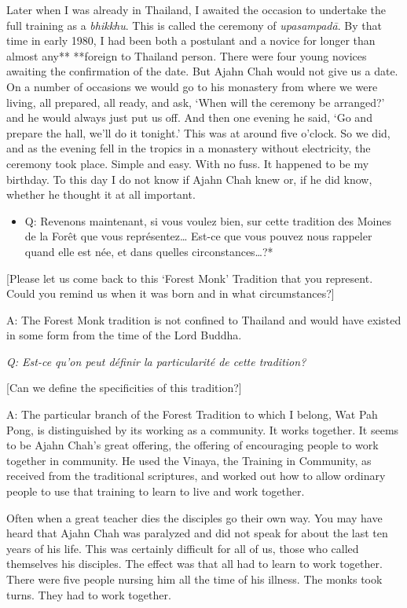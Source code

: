 Later when I was already in Thailand, I awaited the occasion to
undertake the full training as a \emph{bhikkhu}. This is called the
ceremony of \emph{upasampadā}. By that time in early 1980, I had been
both a postulant and a novice for longer than almost any** **foreign to
Thailand person. There were four young novices awaiting the confirmation
of the date. But Ajahn Chah would not give us a date. On a number of
occasions we would go to his monastery from where we were living, all
prepared, all ready, and ask, `When will the ceremony be arranged?' and
he would always just put us off. And then one evening he said, `Go and
prepare the hall, we'll do it tonight.' This was at around five o'clock. 
So we did, and as the evening fell in the tropics in a monastery without
electricity, the ceremony took place. Simple and easy. With no fuss. It
happened to be my birthday. To this day I do not know if Ajahn Chah knew
or, if he did know, whether he thought it at all important. 

\begin{itemize}
\item
  Q: Revenons maintenant, si vous voulez bien, sur cette tradition des
  Moines de la Forêt que vous représentez\ldots{} Est-ce que vous pouvez
  nous rappeler quand elle est née, et dans quelles
  circonstances\ldots{}?*
\end{itemize}

{[}Please let us come back to this `Forest Monk' Tradition that you
represent. Could you remind us when it was born and in what
circumstances?{]}

A: The Forest Monk tradition is not confined to Thailand and would have
existed in some form from the time of the Lord Buddha. 

\emph{Q: Est-ce qu'on peut définir la particularité de cette tradition?}

{[}Can we define the specificities of this tradition?{]}

A: The particular branch of the Forest Tradition to which I belong, Wat
Pah Pong, is distinguished by its working as a community. It works
together. It seems to be Ajahn Chah's great offering, the offering of
encouraging people to work together in community. He used the Vinaya, 
the Training in Community, as received from the traditional scriptures, 
and worked out how to allow ordinary people to use that training to
learn to live and work together. 

Often when a great teacher dies the disciples go their own way. You may
have heard that Ajahn Chah was paralyzed and did not speak for about the
last ten years of his life. This was certainly difficult for all of us, 
those who called themselves his disciples. The effect was that all had
to learn to work together. There were five people nursing him all the
time of his illness. The monks took turns. They had to work together. 

